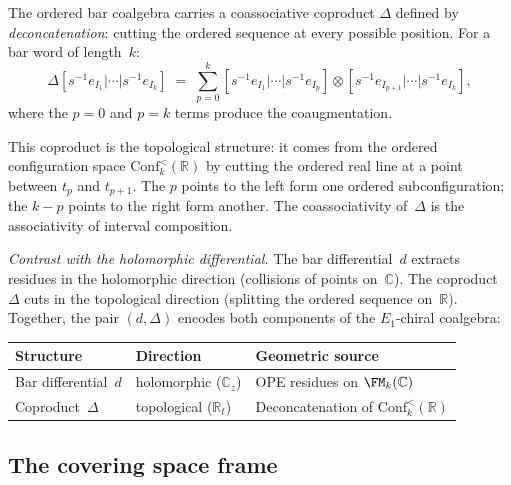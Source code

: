 \begin{construction}
\label{constr:deconcatenation}
The ordered bar coalgebra carries a coassociative coproduct
$\Delta$ defined by \emph{deconcatenation}: cutting the
ordered sequence at every possible position. For a bar word
of length~$k$:
\[
\Delta[s^{-1}e_{I_1}|\cdots|s^{-1}e_{I_k}]
\;=\;
\sum_{p=0}^{k}
[s^{-1}e_{I_1}|\cdots|s^{-1}e_{I_p}]
\otimes
[s^{-1}e_{I_{p+1}}|\cdots|s^{-1}e_{I_k}],
\]
where the $p=0$ and $p=k$ terms produce the coaugmentation.

This coproduct is the topological structure: it comes from
the ordered configuration space
$\mathrm{Conf}_k^{<}(\mathbb R)$ by cutting the
ordered real line at a point between $t_p$ and $t_{p+1}$.
The $p$ points to the left form one ordered subconfiguration;
the $k{-}p$ points to the right form another. The coassociativity
of~$\Delta$ is the associativity of interval composition.

\emph{Contrast with the holomorphic differential.}
The bar differential~$d$ extracts residues in the holomorphic
direction (collisions of points on~$\mathbb C$). The coproduct
$\Delta$ cuts in the topological direction (splitting the
ordered sequence on~$\mathbb R$). Together, the pair
$(d,\Delta)$ encodes both components of the $E_1$-chiral
coalgebra:
\begin{center}
\begin{tabular}{lll}
\textbf{Structure} & \textbf{Direction} &
 \textbf{Geometric source} \\
\hline
Bar differential~$d$ & holomorphic ($\mathbb C_z$) &
 OPE residues on $\FM_k(\mathbb C)$ \\
Coproduct~$\Delta$ & topological ($\mathbb R_t$) &
 Deconcatenation of $\mathrm{Conf}_k^{<}(\mathbb R)$
\end{tabular}
\end{center}
\end{construction}

\subsection{The covering space frame}
\label{subsec:covering-space-frame}

